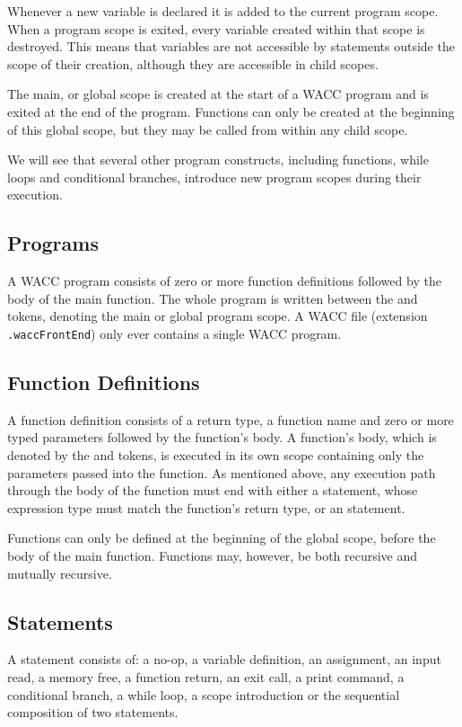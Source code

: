\documentclass[a4paper]{article}
\theoremstyle{definition}
\begin{document}
Whenever a new variable is declared it is added to the current program scope.
When a program scope is exited, every variable created within that scope is destroyed.
This means that variables are not accessible by statements outside the scope of their creation,
although they are accessible in child scopes.

The main, or global scope is created at the start of a WACC program and is exited at the end of the program.
Functions can only be created at the beginning of this global scope, but they may be called from within any child scope.

We will see that several other program constructs, including functions, while loops and conditional branches, 
introduce new program scopes during their execution.

\subsection{Programs}
A WACC program  consists of zero or more function definitions followed by the body of the main function. 
The whole program is written between the  and  tokens, denoting the main or global program scope.
A WACC file (extension {\tt .waccFrontEnd}) only ever contains a single WACC program.

\subsection{Function Definitions}
A function definition  consists of a return type, a function name 
and zero or more typed parameters followed by the function's body.
A function's body, which is denoted by the  and  tokens, is executed in its own scope 
containing only the parameters passed into the function.
As mentioned above, any execution path through the body of the function must end with either a  statement, 
whose expression type must match the function's return type, or an  statement.

Functions can only be defined at the beginning of the global scope, before the body of the main function.
Functions may, however, be both recursive and mutually recursive.

\subsection{Statements}
A statement  consists of: 
a no-op,
a variable definition,
an assignment,
an input read,
a memory free,
a function return,
an exit call,
a print command,
a conditional branch,
a while loop,
a scope introduction
or the sequential composition of two statements.
\end{document}

